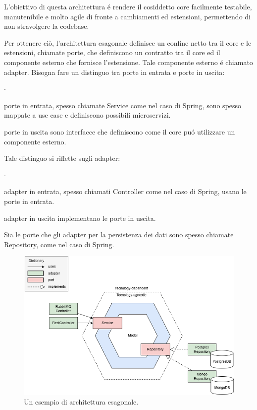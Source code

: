 L’obiettivo di questa architettura é rendere il cosiddetto core facilmente testabile, 
manutenibile e molto agile di fronte a cambiamenti ed estensioni, permettendo di non 
stravolgere la codebase.

Per ottenere ciò, l’architettura esagonale definisce un confine netto tra il core e 
le estensioni, chiamate porte, che definiscono un contratto tra il core ed il componente 
esterno che fornisce l’estensione. Tale componente esterno é chiamato adapter.
Bisogna fare un distinguo tra porte in entrata e porte in uscita:
\begin{list}{$\cdot$}{}
    \item porte in entrata, spesso chiamate Service come nel caso di Spring, sono spesso 
    mappate a use case e definiscono possibili microservizi.
    \item porte in uscita sono interfacce che definiscono come il core puó utilizzare 
    un componente esterno.
\end{list}

Tale distinguo si riflette sugli adapter:
\begin{list}{$\cdot$}{}
    \item adapter in entrata, spesso chiamati Controller come nel caso di Spring, 
    usano le porte in entrata.
    \item adapter in uscita implementano le porte in uscita.
\end{list}

Sia le porte che gli adapter per la persistenza dei dati sono spesso chiamate Repository, 
come nel caso di Spring.

\begin{figure}[H]
    \centering
    \includegraphics[width=\textwidth]{assets/diagrams/hexagonal-architecture.png}
    \caption{Un esempio di architettura esagonale.}
    \label{fig:un esempio di architettura esagonale}
\end{figure}

